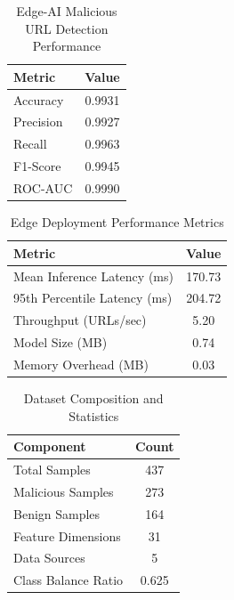 
\begin{table}[h]
\centering
\caption{Edge-AI Malicious URL Detection Performance}
\begin{tabular}{|l|c|}
\hline
\textbf{Metric} & \textbf{Value} \\
\hline
Accuracy & 0.9931 \\
Precision & 0.9927 \\
Recall & 0.9963 \\
F1-Score & 0.9945 \\
ROC-AUC & 0.9990 \\
\hline
\end{tabular}
\label{tab:model_performance}
\end{table}

\begin{table}[h]
\centering
\caption{Edge Deployment Performance Metrics}
\begin{tabular}{|l|c|}
\hline
\textbf{Metric} & \textbf{Value} \\
\hline
Mean Inference Latency (ms) & 170.73 \\
95th Percentile Latency (ms) & 204.72 \\
Throughput (URLs/sec) & 5.20 \\
Model Size (MB) & 0.74 \\
Memory Overhead (MB) & 0.03 \\
\hline
\end{tabular}
\label{tab:performance_metrics}
\end{table}

\begin{table}[h]
\centering
\caption{Dataset Composition and Statistics}
\begin{tabular}{|l|c|}
\hline
\textbf{Component} & \textbf{Count} \\
\hline
Total Samples & 437 \\
Malicious Samples & 273 \\
Benign Samples & 164 \\
Feature Dimensions & 31 \\
Data Sources & 5 \\
Class Balance Ratio & 0.625 \\
\hline
\end{tabular}
\label{tab:dataset_stats}
\end{table}

